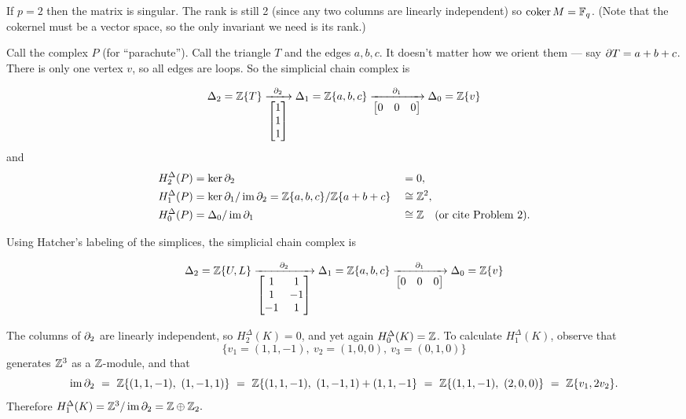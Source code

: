 If $p=2$ then the matrix is singular.  The rank is still 2 (since any two columns are linearly independent) so $\operatorname{coker} M=\mathbb{F}_q$.  (Note that the cokernel  must be a vector space, so the only invariant we need is its rank.)


Call the complex $P$ (for ``parachute'').  Call the triangle $T$ and the edges $a,b,c$.  It doesn't matter how we orient them --- say $\partial T=a+b+c$.  There is only one vertex $v$, so all edges are loops.  So the simplicial chain complex is

\[\Delta_2=\mathbb{Z}\{T\} \xrightarrow[\begin{bmatrix}1\\1\\1\end{bmatrix}]{\partial_2}
\Delta_1=\mathbb{Z}\{a,b,c\} \xrightarrow[\begin{bmatrix}0&0&0\end{bmatrix}]{\partial_1}
\Delta_0=\mathbb{Z}\{v\}\]
and
\begin{align*}
H^\Delta_2(P) &= \ker\partial_2 &&= 0,\\
H^\Delta_1(P) &= \ker\partial_1/\operatorname{im}\partial_2 = \mathbb{Z}\{a,b,c\}/\mathbb{Z}\{a+b+c\}&&\cong\mathbb{Z}^2,\\
H^\Delta_0(P) &= \Delta_0/\operatorname{im}\partial_1 &&\cong \mathbb{Z} \quad\text{(or cite Problem 2)}.
\end{align*}


Using Hatcher's labeling of the simplices, the simplicial chain complex is

\[\Delta_2=\mathbb{Z}\{U,L\} \xrightarrow[\begin{bmatrix}1&1\\1&-1\\-1&1\end{bmatrix}]{\partial_2}
\Delta_1=\mathbb{Z}\{a,b,c\} \xrightarrow[\begin{bmatrix}0&0&0\end{bmatrix}]{\partial_1}
\Delta_0=\mathbb{Z}\{v\}\]

The columns of $\partial_2$ are linearly independent, so $H^\Delta_2(K)=0$, and yet again $H^\Delta_0(K)=\mathbb{Z}$.
To calculate $H^\Delta_1(K)$, observe that 
\[\{v_1=(1,1,-1), \ v_2=(1,0,0), \ v_3=(0,1,0)\}\]
generates $\mathbb{Z}^3$ as a $\mathbb{Z}$-module, and that
\[\operatorname{im}\partial_2 ~=~ \mathbb{Z}\{(1,1,-1),\ (1,-1,1)\}
~=~ \mathbb{Z}\{(1,1,-1),\ (1,-1,1)+(1,1,-1\}
~=~ \mathbb{Z}\{(1,1,-1),\ (2,0,0)\}
~=~ \mathbb{Z}\{v_1,2v_2\}.\]
Therefore $H^\Delta_1(K) = \mathbb{Z}^3/\operatorname{im}\partial_2 = \mathbb{Z}\oplus\mathbb{Z}_2.$

